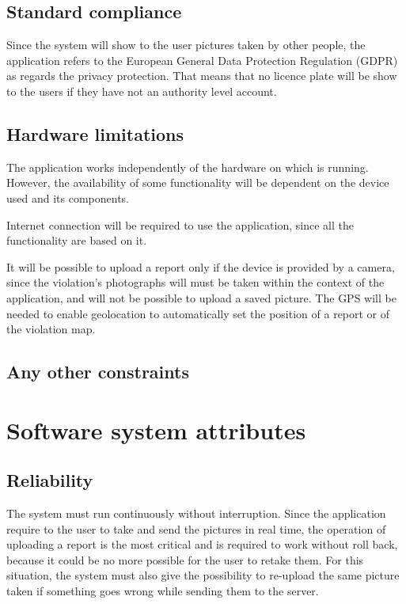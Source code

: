 \documentclass[../RASD.tex]{subfiles}
\begin{document}
            \subsection{Standard compliance}\label{subsec:standard-compliance}
    Since the system will show to the user pictures taken by other people, the application refers to the European General Data Protection Regulation (GDPR) as regards the privacy protection. That means that no licence plate will be show to the users if they have not an authority level account.
    \subsection{Hardware limitations}\label{subsec:hardware-limitations}
    The application works independently of the hardware on which is running. However, the availability of some functionality will be dependent on the device used and its components.

    Internet connection will be required to use the application, since all the functionality are based on it.

    It will be possible to upload a report only if the device is provided by a camera, since the violation's photographs will must be taken within the context of the application, and will not be possible to upload a saved picture. The GPS will be needed to enable geolocation to automatically set the position of a report or of the violation map.
    \subsection{Any other constraints}\label{subsec:any-other-constraints}
        \section{Software system attributes}\label{sec:software-system-attributes}
            \subsection{Reliability}\label{subsec:reliability}
    The system must run continuously without interruption. Since the application require to the user to take and send the pictures in real time, the operation of uploading a report is the most critical and is required to work without roll back, because it could be no more possible for the user to retake them. For this situation, the system must also give the possibility to re-upload the same picture taken if something goes wrong while sending them to the server.
\end{document}
